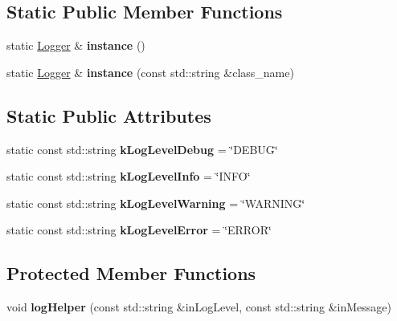 \subsection*{Static Public Member Functions}
\begin{DoxyCompactItemize}
\item 
\mbox{\label{classLogger_a4aa4d7c3b98f6e12e7ea8253da5ea0cd}} 
static \hyperlink{classLogger}{Logger} \& {\bfseries instance} ()
\item 
\mbox{\label{classLogger_a192b4230e191b7f6d38c50d8d20d3c9d}} 
static \hyperlink{classLogger}{Logger} \& {\bfseries instance} (const std\+::string \&class\+\_\+name)
\end{DoxyCompactItemize}
\subsection*{Static Public Attributes}
\begin{DoxyCompactItemize}
\item 
\mbox{\label{classLogger_a13508ec720a1c2f885793ea84befc58e}} 
static const std\+::string {\bfseries k\+Log\+Level\+Debug} = \char`\"{}D\+E\+B\+UG\char`\"{}
\item 
\mbox{\label{classLogger_a8e72302e1254e7f840cfc1cbd9cbd615}} 
static const std\+::string {\bfseries k\+Log\+Level\+Info} = \char`\"{}I\+N\+FO\char`\"{}
\item 
\mbox{\label{classLogger_a8e4174e48cfc36ad766e26d0a16cd5cd}} 
static const std\+::string {\bfseries k\+Log\+Level\+Warning} = \char`\"{}W\+A\+R\+N\+I\+NG\char`\"{}
\item 
\mbox{\label{classLogger_a848ce96cde882ab0709ee26bbd22a5cf}} 
static const std\+::string {\bfseries k\+Log\+Level\+Error} = \char`\"{}E\+R\+R\+OR\char`\"{}
\end{DoxyCompactItemize}
\subsection*{Protected Member Functions}
\begin{DoxyCompactItemize}
\item 
\mbox{\label{classLogger_a95312ad188bc0ffaae6e81e7232fea56}} 
void {\bfseries log\+Helper} (const std\+::string \&in\+Log\+Level, const std\+::string \&in\+Message)
\end{DoxyCompactItemize}
